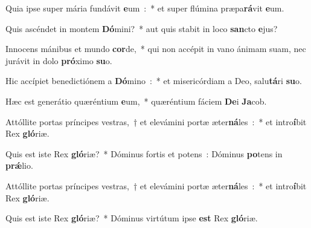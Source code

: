 ﻿\item Quia ipse super mária fundávit \textbf{e}um~:~* et super flúmina præpa\textbf{rá}vit \textbf{e}um.
\item Quis ascéndet in montem \textbf{Dó}mini?~* aut quis stabit in loco \textbf{san}cto \textbf{e}jus?
\item Innocens mánibus et mundo \textbf{cor}de,~* qui non accépit in vano ánimam suam, nec jurávit in dolo \textbf{pró}ximo \textbf{su}o.
\item Hic accípiet benedictiónem a \textbf{Dó}mino~:~* et misericórdiam a Deo, salu\textbf{tá}ri \textbf{su}o.
\item Hæc est generátio quæréntium \textbf{e}um,~* quæréntium fáciem \textbf{De}i \textbf{Ja}cob.\ifx\lalinebreakaftersix\undefined\else\\\fi
\item Attóllite portas príncipes vestras,~† et elevámini portæ æter\textbf{ná}les~:~* et intro\textbf{í}bit Rex \textbf{gló}riæ.
\item Quis est iste Rex \textbf{gló}riæ?~* Dóminus fortis et potens~: Dóminus \textbf{po}tens in \textbf{prǽ}lio.
\item Attóllite portas príncipes vestras,~† et elevámini portæ æter\textbf{ná}les~:~* et intro\textbf{í}bit Rex \textbf{gló}riæ.
\item Quis est iste Rex \textbf{gló}riæ?~* Dóminus virtútum ipse \textbf{est} Rex \textbf{gló}riæ.